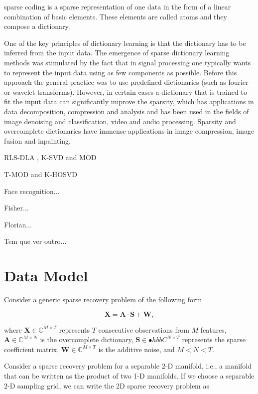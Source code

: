 sparse coding is a sparse representation of one data in the form of a linear combination of basic elements. These elements are called atoms and they compose a dictionary.

One of the key principles of dictionary learning is that the dictionary has to be inferred from the input data. The emergence of sparse dictionary learning methods was stimulated by the fact that in signal processing one typically wants to represent the input data using as few components as possible. Before this approach the general practice was to use predefined dictionaries (such as fourier or wavelet transforms). However, in certain cases a dictionary that is trained to fit the input data can significantly improve the sparsity, which has applications in data decomposition, compression and analysis and has been used in the fields of image denoising and classification, video and audio processing. Sparsity and overcomplete dictionaries have immense applications in image compression, image fusion and inpainting.

RLS-DLA \cite{skretting2010recursive}, K-SVD \cite{aharon2006rm} and MOD \cite{engan1999method}

T-MOD and K-HOSVD \cite{roemer2014tensor} 

Face recognition...

Fisher...

Florian...

Tem que ver outro...


\section{Data Model}
\label{sec:4_datamodel}

Consider a generic sparse recovery problem of the following form

\begin{equation}\label{eq:eq01}
\boldsymbol{X} = \boldsymbol{A} \cdot \boldsymbol{S} + \boldsymbol{W},
\end{equation}

where $\boldsymbol{X} \in \mathbb{C}^{M \times T}$ represents $T$ consecutive observations from $M$ features, $\boldsymbol{A} \in \mathbb{C}^{M \times N}$ is the overcomplete dictionary, $\boldsymbol{S} \in \mathbb{•}hbb{C}^{N \times T}$ represents the sparse coefficient matrix, $\boldsymbol{W} \in \mathbb{C}^{M \times T}$ is the additive noise, and $M < N < T$.

Consider a sparse recovery problem for a separable 2-D manifold, i.e., a manifold that can be written as the product of two 1-D manifolds. If we choose a separable 2-D sampling grid, we can write the 2D sparse recovery problem as

